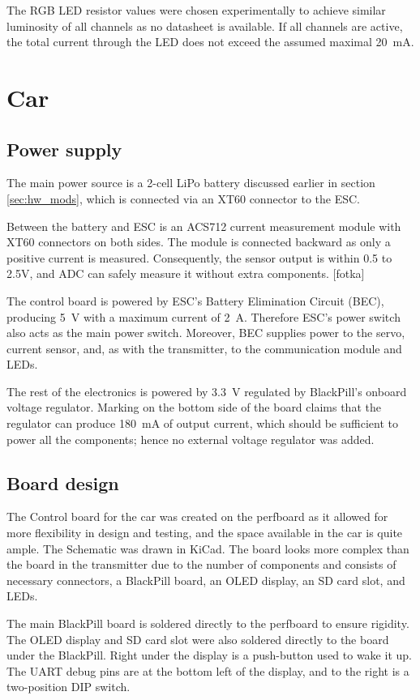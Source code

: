 The RGB LED resistor values were chosen experimentally to achieve similar luminosity of all channels as no datasheet is available. If all channels are active, the total current through the LED does not exceed the assumed maximal \SI{20}{\mA}.


\section{Car}
\label{sec:real_car}
\subsection{Power supply}
The main power source is a 2-cell LiPo battery discussed earlier in section \ref{sec:hw_mods}, which is connected via an XT60 connector to the ESC.

Between the battery and ESC is an ACS712 current measurement module with XT60 connectors on both sides. The module is connected backward as only a positive current is measured. Consequently, the sensor output is within 0.5 to 2.5V, and ADC can safely measure it without extra components. [\todo fotka]

The control board is powered by ESC's Battery Elimination Circuit (BEC), producing \SI{5}{\V} with a maximum current of \SI{2}{\A}. Therefore ESC's power switch also acts as the main power switch. Moreover, BEC supplies power to the servo, current sensor, and, as with the transmitter, to the communication module and LEDs.

The rest of the electronics is powered by \SI{3.3}{\V} regulated by BlackPill's onboard voltage regulator. Marking on the bottom side of the board claims that the regulator can produce \SI{180}{\mA} of output current, which should be sufficient to power all the components; hence no external voltage regulator was added.

\subsection{Board design}
The Control board for the car was created on the perfboard as it allowed for more flexibility in design and testing, and the space available in the car is quite ample. The Schematic was drawn in KiCad. The board looks more complex than the board in the transmitter due to the number of components and consists of necessary connectors, a BlackPill board, an OLED display, an SD card slot, and LEDs.

The main BlackPill board is soldered directly to the perfboard to ensure rigidity. The OLED display and SD card slot were also soldered directly to the board under the BlackPill. Right under the display is a push-button used to wake it up. The UART debug pins are at the bottom left of the display, and to the right is a two-position DIP switch.

